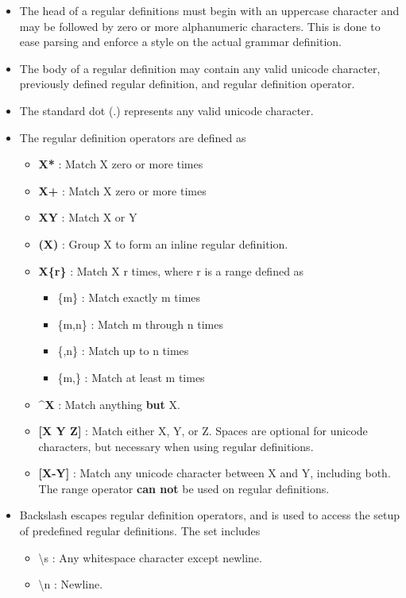 \documentclass[12pt]{article}
\begin{document}
\begin{itemize}

\item The head of a regular definitions must begin with an uppercase character and may be followed by zero or more alphanumeric characters. This is done to ease parsing and enforce a style on the actual grammar definition.

\item The body of a regular definition may contain any valid unicode character, previously defined regular definition, and regular definition operator.

\item The standard dot (.) represents any valid unicode character.

\item The regular definition operators are defined as
  \begin{itemize}
    \item \textbf{X*} : Match X zero or more times
    \item \textbf{X+} : Match X zero or more times
    \item \textbf{X\textbar Y} : Match X or Y
    \item \textbf{(X)}  : Group X to form an inline regular definition.
    \item \textbf{X\{r\}}  : Match X r times, where r is a range defined as 
      \begin{itemize}
        \item \{m\} : Match exactly m times
        \item \{m,n\} : Match m through n times
        \item \{,n\} : Match up to n times
        \item \{m,\} : Match at least m times
      \end{itemize}
    \item \textbf{\textasciicircum X} : Match anything \textbf{but} X.
    \item \textbf{[X Y Z]} : Match either X, Y, or Z. Spaces are optional for unicode characters, but necessary when using regular definitions.
    \item \textbf{[X-Y]}  : Match any unicode character between X and Y, including both. The range operator \textbf{can not} be used on regular definitions.
  \end{itemize}

\item Backslash escapes regular definition operators, and is used to access the setup of predefined regular definitions. The set includes
  \begin{itemize}
    \item \textbackslash s : Any whitespace character except newline.
    \item \textbackslash n : Newline.
  \end{itemize}

\end{itemize}
\end{document}
